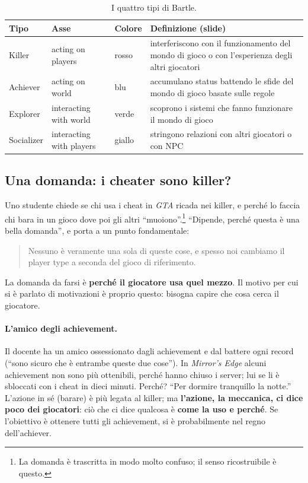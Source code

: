 \begin{table}[ht]
\centering
\small
\begin{tabular}{@{}p{}p{}p{}p{}@{}}
\toprule
\textbf{Tipo} & \textbf{Asse} & \textbf{Colore} & \textbf{Definizione (slide)} \\
\midrule
Killer & acting on players & rosso & interferiscono con il funzionamento del mondo
di gioco o con l'esperienza degli altri giocatori \\
Achiever & acting on world & blu & accumulano status battendo le sfide del mondo di
gioco basate sulle regole \\
Explorer & interacting with world & verde & scoprono i sistemi che fanno
funzionare il mondo di gioco \\
Socializer & interacting with players & giallo & stringono relazioni con altri
giocatori o con NPC \\
\bottomrule
\end{tabular}
\caption{I quattro tipi di Bartle.}
\label{gd18:tab:bartle}
\end{table}

\subsection{Una domanda: i cheater sono killer?}

Uno studente chiede se chi usa i cheat in \emph{GTA} ricada nei killer, e perché lo
faccia chi bara in un gioco dove poi gli altri ``muoiono''.\footnote{La domanda è
trascritta in modo molto confuso; il senso ricostruibile è questo.} ``Dipende, perché
questa è una bella domanda'', e porta a un punto fondamentale:
\begin{quote}
Nessuno è veramente una sola di queste cose, e spesso noi cambiamo il player type a
seconda del gioco di riferimento.
\end{quote}
La domanda da farsi è \textbf{perché il giocatore usa quel mezzo}. Il motivo per cui
si è parlato di motivazioni è proprio questo: bisogna capire che cosa cerca il
giocatore.

\paragraph{L'amico degli achievement.} Il docente ha un amico ossessionato dagli
achievement e dal battere ogni record (``sono sicuro che è entrambe queste due
cose''). In \emph{Mirror's Edge} alcuni achievement non sono più ottenibili, perché
hanno chiuso i server; lui se li è sbloccati con i cheat in dieci minuti. Perché?
``Per dormire tranquillo la notte.'' L'azione in sé (barare) è più legata al killer;
ma \textbf{l'azione, la meccanica, ci dice poco dei giocatori}: ciò che ci dice
qualcosa è \textbf{come la uso e perché}. Se l'obiettivo è ottenere tutti gli
achievement, si è probabilmente nel regno dell'achiever.

